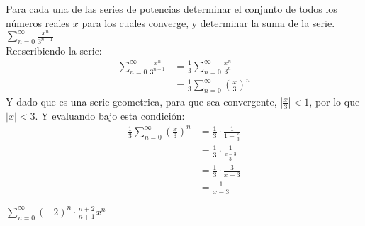 \documentclass[../main.tex]{subfiles}
\begin{document}
Para cada una de las series de potencias determinar el conjunto de todos los números reales $x$ para los cuales converge, y determinar la suma de la serie.
\question $\sum\limits_{n = 0}^\infty \frac{x^n}{3^{n+1}}$\\

Reescribiendo la serie:
\begin{align*}
    \sum_{n = 0}^\infty \frac{x^n}{3^{n+1}} &=\frac{1}{3} \sum_{n = 0}^\infty \frac{x^n}{3^n}\\
    &= \frac{1}{3}\sum_{n = 0}^\infty \left(\frac{x}{3}\right)^n
\end{align*}
Y dado que es una serie geometrica, para que sea convergente, $\left|\frac{x}{3}\right| < 1$, por lo que $|x| < 3$. Y evaluando bajo esta condición:
\begin{align*}
    \frac{1}{3}\sum_{n = 0}^\infty \left(\frac{x}{3}\right)^n &= \frac{1}{3}\cdot \frac{1}{1 - \frac{x}{3}}\\
    &= \frac{1}{3}\cdot \frac{1}{\frac{x-3}{3}}\\
    &= \frac{1}{3}\cdot \frac{3}{x-3}\\
    &= \frac{1}{x-3}
\end{align*}

\question $\sum\limits_{n = 0}^\infty (-2)^n \cdot \frac{n+2}{n+1} x^n$\\
\end{document}
